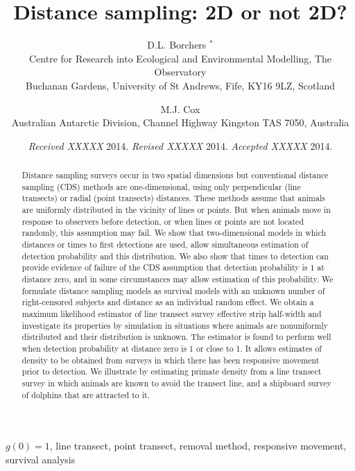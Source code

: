 \documentclass[useAMS,usenatbib,referee]{biom}
\title[2D or not 2D?]{Distance sampling: 2D or not 2D?}
\author{D.L. Borchers $^{*}$\email{dlb@st-andrews.ac.uk} \\
   Centre for Research into Ecological and Environmental Modelling, The Observatory \\
   Buchanan Gardens, University of St Andrews, Fife, KY16 9LZ, Scotland
   \and 
   M.J. Cox \\
   Australian Antarctic Division, Channel Highway Kingston TAS 7050,  Australia
   }
\begin{document}
\date{{\it Received XXXXX} 2014. {\it Revised XXXXX} 2014.  {\it
Accepted XXXXX} 2014.}

\pagerange{\pageref{firstpage}--\pageref{lastpage}}


\begin{abstract}
Distance sampling surveys occur in two spatial dimensions but conventional distance sampling (CDS) methods are one-dimensional, using only perpendicular (line transects) or radial (point transects) distances. These methods assume that animals are uniformly distributed in the vicinity of lines or points. But when animals move in response to observers before detection, or when lines or points are not located randomly, this assumption may fail. We show that two-dimensional models in which distances or times to first detections are used, allow simultaneous estimation of detection probability and this distribution. We also show that times to detection can provide evidence of failure of the CDS assumption that detection probability is 1 at distance zero, and in some circumstances may allow estimation of this probability. We formulate distance sampling models as survival models with an unknown number of right-censored subjects and distance as an individual random effect. We obtain a maximum likelihood estimator of line transect survey effective strip half-width and investigate its properties by simulation in situations where animals are nonuniformly distributed and their distribution is unknown. The estimator is found to perform well when detection probability at distance zero is 1 or close to 1. It allows estimates of density to be obtained from surveys in which there has been responsive movement prior to detection. We illustrate by estimating primate density from a line transect survey in which animals are known to avoid the transect line, and a shipboard survey of dolphins that are attracted to it.
\end{abstract}

\label{firstpage}

\begin{keywords}
$g(0)=1$, line transect, point transect, removal method, responsive movement, survival analysis
\end{keywords}

\maketitle
\end{document}
